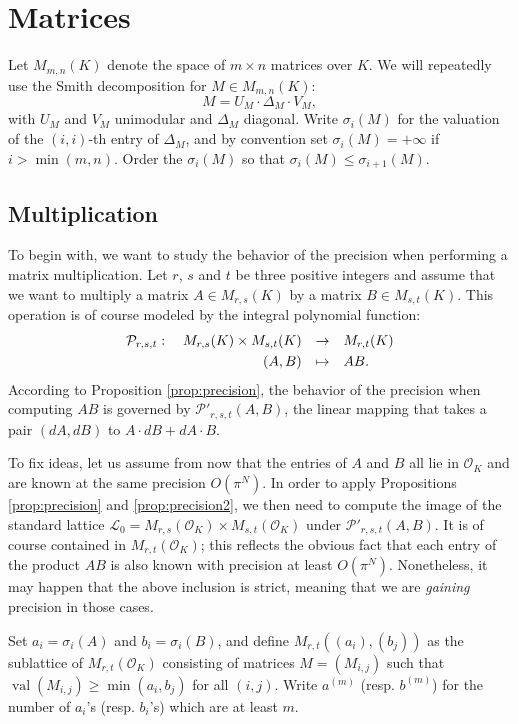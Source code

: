 \documentclass{sig-alternate}
\DeclareMathOperator{\val}{val}
\renewcommand{\O}{\mathcal O}
\begin{document}
\section{Matrices}
\label{sec:matrices}

Let $M_{m,n}(K)$ denote the space of $m \times n$ matrices over $K$.  We will repeatedly
use the Smith decomposition for $M \in M_{m,n}(K)$:
\[
M = U_M \cdot \Delta_M \cdot V_M,
\]
with $U_M$ and $V_M$ unimodular and $\Delta_M$ diagonal.  Write $\sigma_i(M)$
for the valuation of the $(i,i)$-th entry of $\Delta_M$, and by convention set
$\sigma_i(M) = +\infty$ if $i > \min(m,n)$.  Order the $\sigma_i(M)$ so that $\sigma_i(M) \le \sigma_{i+1}(M)$.

\subsection{Multiplication}
\label{ssec:mulmatrix}

To begin with, we want to study the behavior of the precision when 
performing a matrix multiplication. Let $r$, $s$ and $t$ be three 
positive integers and assume that we want to multiply a matrix $A \in 
M_{r,s}(K)$ by a matrix $B \in M_{s,t}(K)$. This operation is of course 
modeled by the integral polynomial function:
$$\begin{array}{rcl}
\mathcal P_{r,s,t} : \quad M_{r,s}(K) \times M_{s,t}(K) & \to & 
M_{r,t}(K) \smallskip \\
(A,B) & \mapsto & AB.
\end{array}$$
According to Proposition \ref{prop:precision}, the behavior of the precision when 
computing $AB$ is governed by $\mathcal P'_{r,s,t}(A,B)$, the linear mapping that takes a pair 
$(dA,dB)$ to $A \cdot dB + dA \cdot B$.

To fix ideas, let us assume from now that the entries of $A$ and $B$ all 
lie in $\O_K$ and are known at the same precision $O(\pi^N)$. In order 
to apply Propositions \ref{prop:precision} and \ref{prop:precision2}, we then need to compute the image 
of the standard lattice $\mathcal L_0 = M_{r,s}(\O_K) \times 
M_{s,t}(\O_K)$ under $\mathcal P'_{r,s,t}(A,B)$. It is of course 
contained in $M_{r,t}(\O_K)$; this reflects the obvious fact that each 
entry of the product $AB$ is also known with precision at least $O(\pi^N)$. 
Nonetheless, it may happen that the above inclusion is strict, meaning 
that we are \emph{gaining} precision in those cases.

Set $a_i = \sigma_i(A)$ and $b_i = \sigma_i(B)$, and define $M_{r,t}((a_i),(b_j))$ 
as the sublattice of $M_{r,t}(\O_K)$ consisting of matrices $M = (M_{i,j})$ 
such that $\val(M_{i,j}) \geq \min(a_i,b_j)$ for all $(i,j)$.  Write $a^{(m)}$ (resp. $b^{(m)}$)
for the number of $a_i$'s (resp. $b_i$'s) which are at least $m$.
\end{document}
